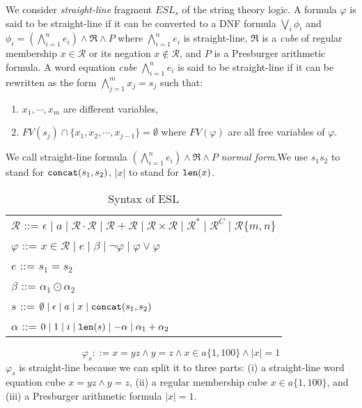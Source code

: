 \documentclass[runningheads]{llncs}
\newcommand*{\regex}{\mathcal{R}}
\begin{document}
We consider \emph{straight-line} fragment\cite{atva2020}\cite{quadratic_aplas2018} $ESL_{s}$ of the string theory logic. 
A formula $\varphi$ is said to be straight-line if it can be converted to a DNF formula $\bigvee_{i} \phi_i$ and $\phi_i= (\bigwedge_{i=1}^n e_i) \wedge \Re \wedge P$
where $\bigwedge_{i=1}^n e_i$ is straight-line, $\Re$ is a
\emph{cube} of regular membership $x\in \regex$ or its negation $x\not\in \regex$, and $P$ is a Presburger arithmetic formula. A word equation \emph{cube} $\bigwedge_{i=1}^n e_i$ is said to be straight-line if it can be rewritten as the form $\bigwedge_{j=1}^m x_j = s_j$ such that:
\begin{enumerate}
  \item $x_1, \cdots, x_m$ are different variables,
  \item $FV(s_j)\cap \{x_1, x_2, \cdots, x_{j-1}\} = \emptyset$ where $FV(\varphi)$ are all free variables of $\varphi$. \label{straigth_line_condition_2}
\end{enumerate} 
We call straight-line formula $(\bigwedge_{i=1}^n e_i) \wedge \Re \wedge P$ \emph{normal form}.We use $s_1s_2$ to stand for $\verb|concat|(s_1,s_2)$, $|x|$ to
stand for $\verb|len|(x)$.
\begin{table}[H]
  \centering
  \begin{tabular}{l}
    $\regex$ ::= $\epsilon\mid a\mid \regex\cdot\regex\mid \regex+\regex\mid \regex\times \regex\mid \regex^*\mid\regex^C \mid \regex\{m,n\}$ \\
    $\varphi$ ::= $x\in \regex\mid e\mid\beta\mid \neg\varphi\mid \varphi\vee\varphi$                                                      \\
    $e$ ::= $s_1=s_2 $                                                                                                                     \\
    $\beta$ ::= $\alpha_1\odot \alpha_2$                                                                                                   \\
    $s$ ::= $\emptyset \mid \epsilon \mid a\mid x\mid \verb|concat|(s_1, s_2)$                                                             \\
    $\alpha$ ::= $0\mid 1\mid i \mid  \verb|len|(s)\mid -\alpha\mid \alpha_1+\alpha_2$ 
  \end{tabular}
  \caption{Syntax of ESL}
  \label{tab:syntax}
\end{table}

\begin{example}
  \begin{equation} \label{eq:1}
    \varphi_s ::= x =yz \wedge y = z \wedge x\in a\{1,100\} \wedge |x| = 1
  \end{equation}
  $\varphi_s$ is straight-line because we can split it to three parts: (i) a straight-line word equation cube $x =yz \wedge y = z$,
  (ii) a regular membership cube $x\in a\{1,100\}$, and (iii) a Presburger arithmetic formula $|x| = 1$.
\end{example}
\end{document}
